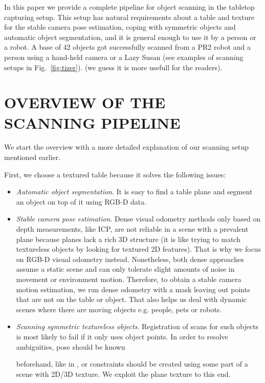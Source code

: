 \documentclass[letterpaper, 10 pt, conference]{ieeeconf}  %
\begin{document}
In this paper we provide a complete pipeline for object scanning
in the tabletop capturing setup. This setup has natural requirements
about a table and texture for the stable camera pose estimation,
coping with symmetric objects and automatic object segmentation, and it is general enough
to use it by a person or a robot. A base of 42 objects
got successfully scanned from a PR2 robot and a person using a hand-held camera or a Lazy Susan (see 
examples of scanning setups in Fig.~\ref{fig:tizer}).
(we guess it is more usefull for the readers).

\section{OVERVIEW OF THE SCANNING PIPELINE}

\label{sec:overview}

We start the overview with a more detailed explanation
of our scanning setup mentioned earlier.

First, we choose a textured table because it solves the following issues:

\begin{itemize}

\item \textit{Automatic object segmentation}. It is easy to find a table plane and segment an object on top of 
it using RGB-D data.
\item \textit{Stable camera pose estimation}. Dense visual odometry methods only based on depth measurements,
like ICP, are not reliable in a scene with a prevalent plane \cite{rusinkiewicz2002real}
because planes lack a rich 3D structure (it is like trying to match textureless objects by looking for textured 2D 
features). That is why we focus on RGB-D visual odometry instead. Nonetheless, both dense approaches
assume a static scene and can only tolerate slight amounts of noise in movement or environment motion. Therefore,
to obtain a stable camera motion estimation, we run dense odometry with a mask leaving out points that are not on 
the table or object. That also helps us deal with dynamic scenes where there are moving objects e.g. people, pets or 
robots.
\item \textit{Scanning symmetric textureless objects}. Registration of scans for such objects
is most likely to fail if it only uses object points. In order to resolve ambiguities, pose should be known 

beforehand, like in \cite{krainin2011manipulator},
or constraints should be created using some part of a scene with
2D/3D texture. We exploit the plane texture to this end.
\end{itemize}
\end{document}
